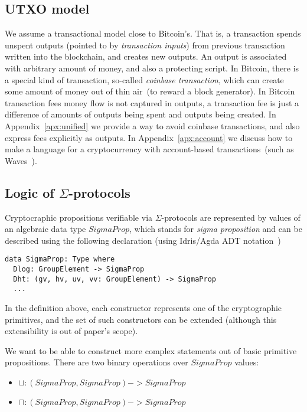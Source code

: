 \documentclass[11pt]{article}
\begin{document}
\subsection{UTXO model}

We assume a transactional model close to Bitcoin's. That is, a transaction spends unspent outputs (pointed to by \emph{transaction inputs}) from previous transaction written into the blockchain, and creates new outputs. An output is associated with arbitrary amount of money, and also a protecting script. In Bitcoin, there is a special kind of transaction, so-called {\em coinbase transaction}, which can create some amount of money out of thin air~(to reward a block generator). In Bitcoin transaction fees money flow is not captured in outputs, a transaction fee is just a difference of amounts of outputs being spent and outputs being created. In Appendix~\ref{apx:unified} we provide a way to avoid coinbase transactions, and also express fees explicitly as outputs. In Appendix~\ref{apx:account} we discuss how to make a language for a cryptocurrency with account-based transactions~(such as Waves~\cite{Waves}).

\subsection{Logic of $\Sigma$-protocols}

Cryptocraphic propositions verifiable via $\Sigma$-protocols are represented by values of an algebraic data type $SigmaProp$,
which stands for \emph{sigma proposition} and can be described using the following declaration (using Idris/Agda ADT notation~\cite{Idris, Agda})

\begin{lstlisting}
data SigmaProp: Type where
  Dlog: GroupElement -> SigmaProp
  Dht: (gv, hv, uv, vv: GroupElement) -> SigmaProp
  ...
\end{lstlisting}

In the definition above, each constructor represents one of the cryptographic primitives, and the set of such constructors
can be extended (although this extensibility is out of paper's scope).

We want to be able to construct more complex statements out of basic primitive propositions.
There are two binary operations over $SigmaProp$ values:
\begin{itemize}
\item $\sqcup: (SigmaProp, SigmaProp) -> SigmaProp$
\item $\sqcap: (SigmaProp, SigmaProp) -> SigmaProp$
\end{itemize}
\end{document}
